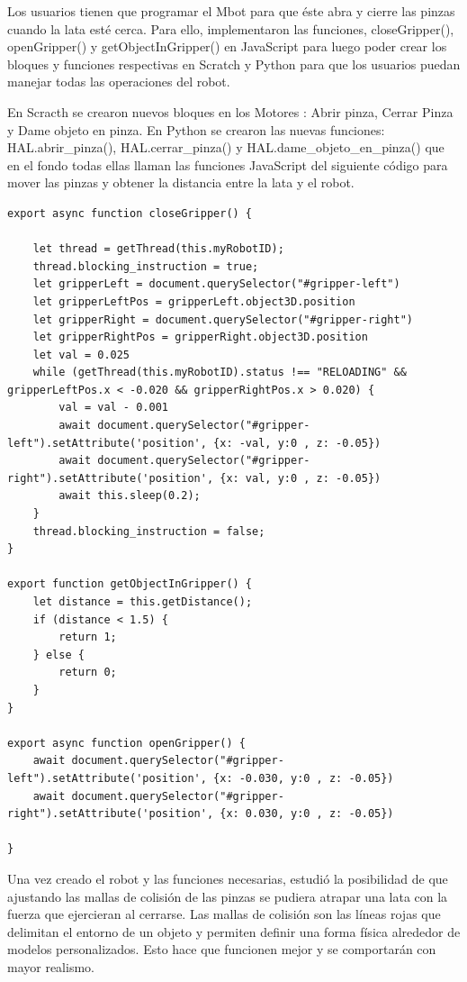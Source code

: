 Los usuarios tienen que programar el Mbot para que éste abra y cierre las pinzas cuando la lata esté cerca. Para ello, implementaron las funciones, closeGripper(), openGripper() y getObjectInGripper() en JavaScript para luego poder crear los bloques y funciones respectivas en Scratch y Python para que los usuarios puedan manejar todas las operaciones del robot. 
 
En Scracth se crearon nuevos bloques en los Motores : Abrir pinza, Cerrar Pinza y Dame objeto en pinza.
En Python  se crearon las nuevas funciones: HAL.abrir\_pinza(), HAL.cerrar\_pinza() y  HAL.dame\_objeto\_en\_pinza() que en el fondo todas ellas llaman las funciones JavaScript  del siguiente código para mover las pinzas y obtener la distancia entre la lata y el robot.
 
\begin{lstlisting}
export async function closeGripper() {

    let thread = getThread(this.myRobotID);
    thread.blocking_instruction = true;
    let gripperLeft = document.querySelector("#gripper-left")
    let gripperLeftPos = gripperLeft.object3D.position
    let gripperRight = document.querySelector("#gripper-right")
    let gripperRightPos = gripperRight.object3D.position
    let val = 0.025
    while (getThread(this.myRobotID).status !== "RELOADING" && gripperLeftPos.x < -0.020 && gripperRightPos.x > 0.020) {
        val = val - 0.001
        await document.querySelector("#gripper-left").setAttribute('position', {x: -val, y:0 , z: -0.05})
        await document.querySelector("#gripper-right").setAttribute('position', {x: val, y:0 , z: -0.05})
        await this.sleep(0.2);
    }
    thread.blocking_instruction = false;
}

export function getObjectInGripper() {
    let distance = this.getDistance();
    if (distance < 1.5) {
        return 1;
    } else {
        return 0;
    }
}

export async function openGripper() {
    await document.querySelector("#gripper-left").setAttribute('position', {x: -0.030, y:0 , z: -0.05})
    await document.querySelector("#gripper-right").setAttribute('position', {x: 0.030, y:0 , z: -0.05})

}
\end{lstlisting}


Una vez creado el robot y las funciones necesarias, estudió la posibilidad de que ajustando  las mallas de colisión de las pinzas se pudiera atrapar una lata con la fuerza que ejercieran al cerrarse. 
Las mallas de colisión son las líneas rojas que delimitan el entorno de un objeto y permiten definir una forma física alrededor de modelos personalizados. Esto hace que funcionen mejor y se comportarán con mayor realismo.

